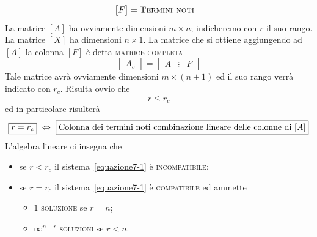 \begin{enumerate}
\begin{align*}
\begin{bmatrix}
F
\end{bmatrix} &= \textup{\textsc{Termini noti}} 
\end{align*}
La matrice $[ A ]$ ha ovviamente dimensioni $m\times n$; indicheremo con $r$ il suo rango. La matrice $[ X ]$ ha dimensioni $n\times 1$. La matrice che si ottiene aggiungendo ad $[ A ]$ la colonna $[ F ]$ è detta \textsc{matrice completa} 
\begin{equation*}
\begin{bmatrix}
A_c
\end{bmatrix} 
= 
\begin{bmatrix} 
A & \vdots & F
\end{bmatrix}
\end{equation*}
Tale matrice avrà ovviamente dimensioni $m\times(n+1)$ ed il suo rango verrà indicato con $r_c$. Risulta ovvio che
\begin{equation*}
r\le r_c
\end{equation*}
ed in particolare risulterà
\begin{equation*}
\boxed{r = r_c} \,\,\Leftrightarrow\,\, \boxed{\textup{Colonna dei termini noti combinazione lineare delle colonne di } [A]}
\end{equation*}
L'algebra lineare ci insegna che
\begin{itemize}
\item se $r<r_c$ il sistema~\eqref{equazione7-1} è \textsc{incompatibile};
\item se $r=r_c$ il sistema~\eqref{equazione7-1} è \textsc{compatibile} ed ammette
\begin{itemize}
\item $1$ \textsc{soluzione} se $r=n$;
\item $\infty^{n-r}$ \textsc{soluzioni} se $r<n$.

\end{itemize}
\end{itemize}
\end{enumerate}
